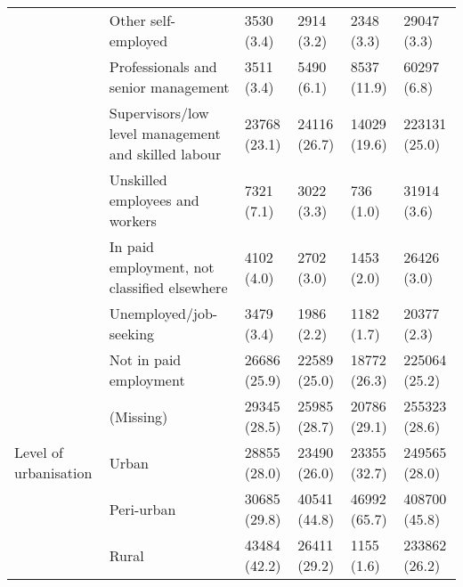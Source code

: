 \begin{tabular}{llllll}
 & Other self-employed & 3530 (3.4) & 2914 (3.2) & 2348 (3.3) & 29047 (3.3)\\
 & Professionals and senior management & 3511 (3.4) & 5490 (6.1) & 8537 (11.9) & 60297 (6.8)\\
 & Supervisors/low level management and skilled labour & 23768 (23.1) & 24116 (26.7) & 14029 (19.6) & 223131 (25.0)\\
 & Unskilled employees and workers & 7321 (7.1) & 3022 (3.3) & 736 (1.0) & 31914 (3.6)\\
 & In paid employment, not classified elsewhere & 4102 (4.0) & 2702 (3.0) & 1453 (2.0) & 26426 (3.0)\\
 & Unemployed/job-seeking & 3479 (3.4) & 1986 (2.2) & 1182 (1.7) & 20377 (2.3)\\
 & Not in paid employment & 26686 (25.9) & 22589 (25.0) & 18772 (26.3) & 225064 (25.2)\\
 & (Missing) & 29345 (28.5) & 25985 (28.7) & 20786 (29.1) & 255323 (28.6)\\
\addlinespace
Level of urbanisation & Urban & 28855 (28.0) & 23490 (26.0) & 23355 (32.7) & 249565 (28.0)\\
 & Peri-urban & 30685 (29.8) & 40541 (44.8) & 46992 (65.7) & 408700 (45.8)\\
 & Rural & 43484 (42.2) & 26411 (29.2) & 1155 (1.6) & 233862 (26.2)\\
\bottomrule
\end{tabular}